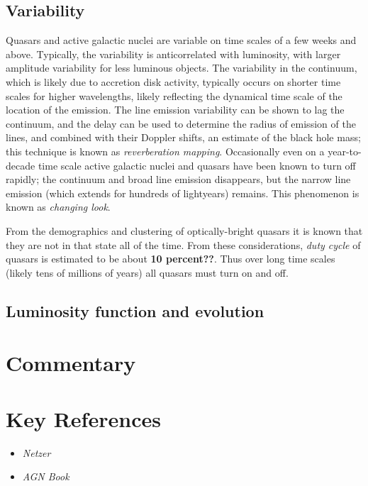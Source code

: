 \subsection{Variability}

Quasars and active galactic nuclei are variable on time scales of a
few weeks and above. Typically, the variability is anticorrelated with
luminosity, with larger amplitude variability for less luminous
objects. The variability in the continuum, which is likely due to
accretion disk activity, typically occurs on shorter time scales for
higher wavelengths, likely reflecting the dynamical time scale of the
location of the emission.  The line emission variability can be shown
to lag the continuum, and the delay can be used to determine the
radius of emission of the lines, and combined with their Doppler
shifts, an estimate of the black hole mass; this technique is known as
{\it reverberation mapping}. Occasionally even on a year-to-decade
time scale active galactic nuclei and quasars have been known to turn
off rapidly; the continuum and broad line emission disappears, but the
narrow line emission (which extends for hundreds of lightyears)
remains. This phenomenon is known as {\it changing look}.

From the demographics and clustering of optically-bright quasars it is
known that they are not in that state all of the time. From these
considerations, {\it duty cycle} of quasars is estimated to be about
{\bf 10 percent??}. Thus over long time scales (likely tens of
millions of years) all quasars must turn on and off.

\subsection{Luminosity function and evolution}


\section{Commentary}

\section{Key References}

\begin{itemize}
  \item
    {\it Netzer}
  \item
    {\it AGN Book}
\end{itemize}

